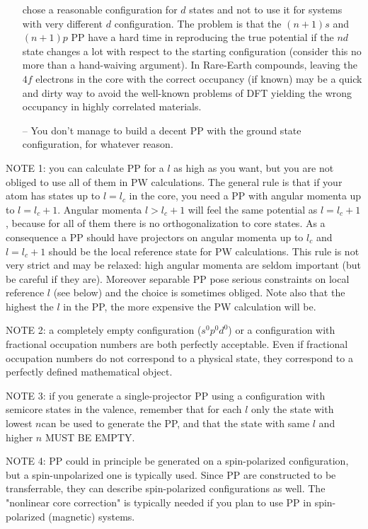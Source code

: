 \begin{enumerate}
   chose a reasonable configuration for $d$ states and not to use it
   for systems with very different $d$ configuration. The problem is that
   the $(n+1)s$ and $(n+1)p$ PP have a hard time in reproducing the true
   potential if the $nd$ state changes a lot with respect to the
   starting configuration (consider this no more than a hand-waiving 
   argument). In Rare-Earth compounds, leaving the $4f$ electrons in the 
   core with the correct occupancy (if known) may be a quick and dirty way 
   to avoid the well-known problems of DFT yielding the wrong occupancy 
   in highly correlated materials.
\item[--]
   You don't manage to build a decent PP with the ground state configuration, 
   for whatever reason.
\end{enumerate}

NOTE 1: you can calculate PP for a $l$ as high as you want, but you
are not obliged to use all of them in PW calculations. The general
rule is that if your atom has states up to $l=l_c$ in the core, you
need a PP with angular momenta up to $l=l_c+1$. Angular momenta
$l>l_c+1$ will feel the same potential as $l=l_c+1$, because
for all of them there is no orthogonalization to core states.
As a consequence a PP should have projectors on angular momenta up to
$l_c$ and $l=l_c+1$ should be the local reference state for PW
calculations. This rule is not very strict and may be relaxed: high
angular momenta are seldom important (but be careful if they are). 
Moreover separable PP pose serious constraints on local reference $l$
(see below) and the choice is sometimes obliged. Note also that the
highest the $l$ in the PP, the more expensive the PW calculation will 
be.

NOTE 2: a completely empty configuration ($s^0p^0d^0$) or
a configuration with fractional occupation numbers are both
perfectly acceptable. Even if fractional occupation numbers do
not correspond to a physical state, they correspond to a
perfectly defined mathematical object.

NOTE 3: if you generate a single-projector PP using a configuration
with semicore states in the valence, remember that for each $l$
only the state with lowest $n$can be used to generate the PP, 
and that the state with same $l$ and higher $n$ MUST BE EMPTY.

NOTE 4: PP could in principle be generated on a spin-polarized
configuration, but a spin-unpolarized one is typically used.
Since PP are constructed to be transferrable, they can describe
spin-polarized configurations as well. The "nonlinear core correction" 
is typically needed if you plan to use PP in spin-polarized (magnetic)
systems.


